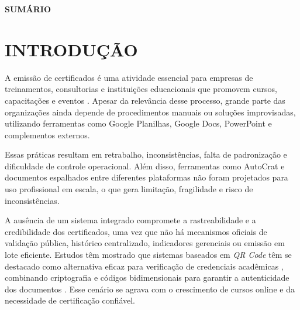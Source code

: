 \documentclass[12pt,openright,oneside,a4paper]{article}
\renewcommand{\contentsname}{SUMÁRIO}
\renewcommand{\headrulewidth}{0pt}
\renewcommand{\headrulewidth}{0pt}
\renewcommand{\headrulewidth}{0pt}
\newcounter{rn}
\begin{document}
\newpage
\thispagestyle{pretextual}

\newpage
\thispagestyle{pretextual}
\listoftables

\newpage
\thispagestyle{pretextual}


\newpage
\thispagestyle{pretextual}
\bgroup
\renewcommand{\contentsname}{}
\begin{center}
\textbf{SUMÁRIO}
\end{center}
\tableofcontents
\egroup
\newpage

\renewcommand{\thepage}{\arabic{page}}
\pagestyle{fancy}
\fancyhf{}
\fancyhead[R]{\thepage\hspace*{0.65cm}}
\renewcommand{\headrulewidth}{0pt}
\thispagestyle{fancy}

\section{INTRODUÇÃO}

A emissão de certificados é uma atividade essencial para empresas de treinamentos, consultorias e instituições educacionais que promovem cursos, capacitações e eventos \cite{rahman2026,kulkarni2025}. Apesar da relevância desse processo, grande parte das organizações ainda depende de procedimentos manuais ou soluções improvisadas, utilizando ferramentas como Google Planilhas, Google Docs, PowerPoint e complementos externos.

Essas práticas resultam em retrabalho, inconsistências, falta de padronização e dificuldade de controle operacional. Além disso, ferramentas como AutoCrat \cite{autocrat2025} e documentos espalhados entre diferentes plataformas não foram projetados para uso profissional em escala, o que gera limitação, fragilidade e risco de inconsistências.

A ausência de um sistema integrado compromete a rastreabilidade e a credibilidade dos certificados, uma vez que não há mecanismos oficiais de validação pública, histórico centralizado, indicadores gerenciais ou emissão em lote eficiente. Estudos têm mostrado que sistemas baseados em \textit{QR Code} têm se destacado como alternativa eficaz para verificação de credenciais acadêmicas \cite{rahman2026}, combinando criptografia e códigos bidimensionais para garantir a autenticidade dos documentos \cite{wellem2021}. Esse cenário se agrava com o crescimento de cursos online e da necessidade de certificação confiável.
\end{document}
